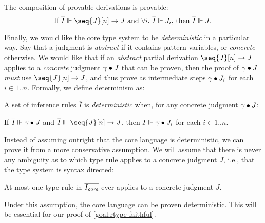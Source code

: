 \begin{assumption}
  \label{assumption:rtype-composition}
  The composition of provable derivations is provable: \\
  \[\text{
  If  $\saysVD{\overline{I}}{\seq{J}[n]}{J}$
  and $\Forall{i} \saysJ{\overline{I}}{J_i}$,
  then $\saysJ{\overline{I}}{J}$.
  }\]
\end{assumption}

Finally, we would like the core type system to be
\emph{deterministic} in a particular way.
Say that a judgment is \emph{abstract} if it contains pattern
variables, or \emph{concrete} otherwise.
We would like that if an \emph{abstract} partial derivation
$\seq{J}[n] \to J$ applies to a \emph{concrete}
judgment $\gamma \bullet J$ that can be proven, then the proof of
$\gamma \bullet J$ \emph{must} use $\seq{J}[n] \to J$,
and thus prove as intermediate steps $\gamma \bullet J_i$ for each $i \in 1..n$.
Formally, we define determinism as:

\begin{definition}[Determinism]
  \label{def:rtype-determinism}
  A set of inference rules $\overline{I}$ is \emph{deterministic} when,
  for any concrete judgment $\gamma \bullet J$:
  
  If $\overline{I} \Vdash \gamma \bullet J$
  and $\saysVD{\overline{I}}{\seq{J}[n]}{J}$,
  then $\overline{I} \Vdash \gamma \bullet J_i$ for each $i \in 1..n$.
\end{definition}

Instead of assuming outright that the core language is deterministic,
we can prove it from a more conservative assumption. We will assume
that there is never any ambiguity
as to which type rule applies to a concrete judgment $J$, i.e., that
the type system is syntax directed:

\begin{assumption}
  \label{assumption:rtype-unique-rule}
  At most one type rule in $\overline{I_\textit{core}}$ ever applies to a concrete
  judgment $J$.
\end{assumption}

Under this assumption, the core language can be proven
deterministic. This will be essential for our proof of
\cref{goal:rtype-faithful}.


